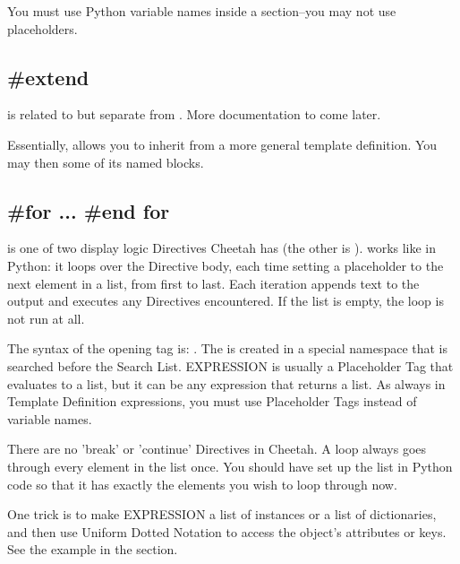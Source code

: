You must use Python variable names inside a  section--you may not
use placeholders.

\subsection{\#extend}

 is related to but separate from 
.  More documentation to come later.

Essentially,  allows you to inherit from
a more general template definition.  You may then  some of its
named blocks.

\subsection{\#for ... \#end for}

 is one of two display logic Directives Cheetah has (the other is
).   works like in Python: it loops over the Directive
body, each time setting a placeholder to the next element in a list, from first
to last.  Each iteration appends text to the output and executes any
Directives encountered.  If the list is empty, the loop is not run at all.

The syntax of the opening tag is: .  The  is created in a special namespace
that is searched before the Search List.  EXPRESSION is usually a 
Placeholder Tag that evaluates to a list, but it can be any expression that
returns a list.  As always in Template Definition expressions, you must use
Placeholder Tags instead of variable names.

There are no 'break' or 'continue' Directives in Cheetah.  A  loop
always goes through every element in the list once.  You should have set up the
list in Python code so that it has exactly the elements you wish to loop through
now.


One trick is to make EXPRESSION a list of instances or a list of dictionaries,
and then use Uniform Dotted Notation to access the object's attributes or keys.
See the example in the  section.

